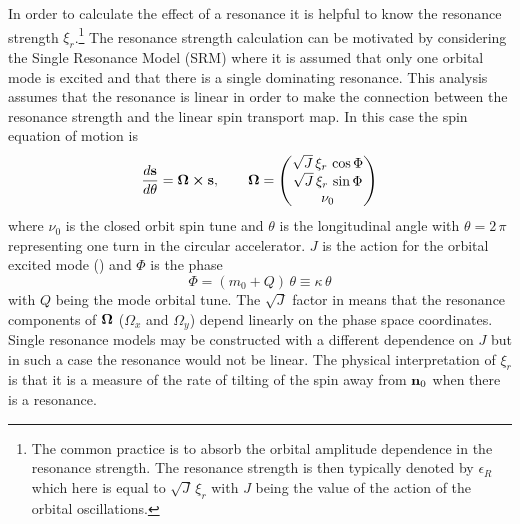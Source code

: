In order to calculate the effect of a resonance it is helpful to know the resonance strength
$\xi_r$.\footnote
  {
The common practice is to absorb the orbital amplitude dependence in the resonance strength.  The
resonance strength is then typically denoted by $\epsilon_R$ which here is equal to $\sqrt{J} \,
\xi_r$ with $J$ being the value of the action of the orbital oscillations.
  }
The resonance strength calculation can be motivated by considering the Single Resonance Model
(SRM)\cite{b:spin.hoff} where it is assumed that only one orbital mode is excited and that there is
a single dominating resonance. This analysis assumes that the resonance is linear in order to make
the connection between the resonance strength and the linear spin transport map. In this case the
spin equation of motion is
\begin{equation}
  \frac{d {\bf s}}{d \theta} = {\bf \Omega} \mathbin{\boldsymbol{\times}} {\bf s}, \qquad 
  {\bf \Omega} = \begin{pmatrix}
    \sqrt{J} \, \xi_r \, \cos \Phi \\
    \sqrt{J} \, \xi_r \, \sin \Phi \\
    \nu_0
  \end{pmatrix}
  \label{stos}
\end{equation}
where $\nu_0$ is the closed orbit spin tune and $\theta$ is the longitudinal angle with $\theta = 2
\, \pi$ representing one turn in the circular accelerator. $J$ is the action for the orbital excited
mode () and $\Phi$ is the phase
\begin{equation}
  \Phi = (m_0 + Q) \, \theta \equiv \kappa \, \theta
\end{equation}
with $Q$ being the mode orbital tune. The $\sqrt{J}$ factor in  means that the resonance
components of ${\bf \Omega}$ ($\Omega_x$ and $\Omega_y$) depend linearly on the phase space
coordinates. Single resonance models may be constructed with a different dependence on $J$ but in
such a case the resonance would not be linear. The physical interpretation of $\xi_r$ is that it is
a measure of the rate of tilting of the spin away from ${\bf n}_0$ when there is a resonance.

